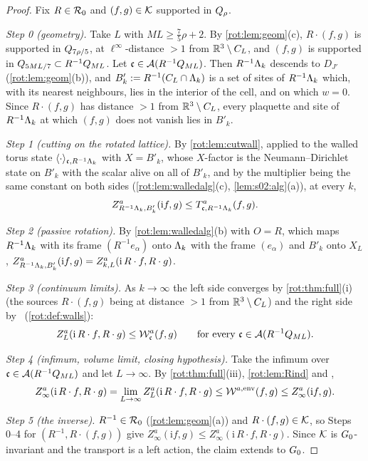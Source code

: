\begin{proof}
Fix $R\in\mathcal R_0$ and $(f,g)\in\mathcal K$ supported in $Q_{\rho}$.

\emph{Step 0 (geometry).} Take $L$ with $ML\ge\frac75\rho+2$. By \cref{rot:lem:geom}(c), $R\cdot(f,g)$ is supported in $Q_{7\rho/5}$,
at $\ell^\infty$-distance $>1$ from $\mathbb R^3\setminus C_L$, and $(f,g)$ is supported in $Q_{5ML/7}\subset R^{-1}Q_{ML}$. Let
$\mathfrak c\in\mathcal A(R^{-1}Q_{ML})$. Then $R^{-1}\Lambda_k$ descends to $D_{J'}$ (\cref{rot:lem:geom}(b)), and $B'_k:= R^{-1}(C_L\cap\Lambda_k)$ is a set
of sites of $R^{-1}\Lambda_k$ which, with its nearest neighbours, lies in the interior of the cell, and on which $w=0$. Since $R\cdot(f,g)$ has
distance $>1$ from $\mathbb R^3\setminus C_L$, every plaquette and site of $R^{-1}\Lambda_k$ at which $(f,g)$ does not vanish lies in $B'_k$.

\emph{Step 1 (cutting on the rotated lattice).} By \cref{rot:lem:cutwall}, applied to the walled torus state
$\langle\cdot\rangle_{\mathfrak c,R^{-1}\Lambda_k}$ with $X=B'_k$, whose $X$-factor is the Neumann--Dirichlet state on $B'_k$ with the scalar alive on
all of $B'_k$, and by the multiplier being the same constant on both sides (\cref{rot:lem:walledalg}(c), \cref{lem:s02:alg}(a)), at every $k$,
\[
Z^a_{R^{-1}\Lambda_k,B'_k}(\mathrm if,g)\le T^{a}_{\mathfrak c,R^{-1}\Lambda_k}(f,g).
\]

\emph{Step 2 (passive rotation).} By \cref{rot:lem:walledalg}(b) with $O=R$, which maps $R^{-1}\Lambda_k$ with its frame $(R^{-1}e_\alpha)$ onto
$\Lambda_k$ with the frame $(e_\alpha)$ and $B'_k$ onto $X_L$,
$Z^a_{R^{-1}\Lambda_k,B'_k}(\mathrm if,g)=Z^a_{k,L}(\mathrm i\,R\cdot f,R\cdot g)$.

\emph{Step 3 (continuum limits).} As $k\to\infty$ the left side converges by \cref{rot:thm:full}(i) (the sources $R\cdot(f,g)$ being at
distance $>1$ from $\mathbb R^3\setminus C_L$) and the right side by \Ka\ (\cref{rot:def:walls}):
\[
Z^a_L(\mathrm i\,R\cdot f,R\cdot g)\le\mathcal W^a_{\mathfrak c}(f,g)\qquad\text{for every }\mathfrak c\in\mathcal A(R^{-1}Q_{ML}).
\]

\emph{Step 4 (infimum, volume limit, closing hypothesis).} Take the infimum over $\mathfrak c\in\mathcal A(R^{-1}Q_{ML})$ and let $L\to\infty$. By
\cref{rot:thm:full}(iii), \cref{rot:lem:Rind} and \TIa,
\[
Z^a_\infty(\mathrm i\,R\cdot f,R\cdot g)=\lim_{L\to\infty}Z^a_L(\mathrm i\,R\cdot f,R\cdot g)\le\mathcal W^{a,\mathrm{env}}(f,g)\le Z^a_\infty(\mathrm if,g).
\]

\emph{Step 5 (the inverse).} $R^{-1}\in\mathcal R_0$ (\cref{rot:lem:geom}(a)) and $R\cdot(f,g)\in\mathcal K$, so Steps 0--4 for $(R^{-1},R\cdot(f,g))$
give $Z^a_\infty(\mathrm if,g)\le Z^a_\infty(\mathrm i\,R\cdot f,R\cdot g)$. Since $\mathcal K$ is $G_0$-invariant and the transport is a left
action, the claim extends to $G_0$.
\end{proof}

